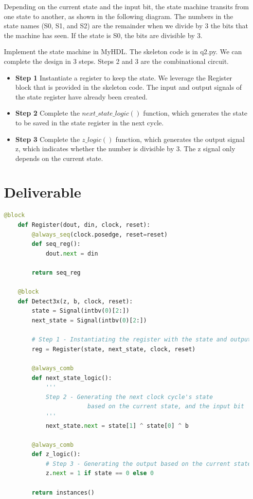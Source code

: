 \documentclass{article}
\begin{document}
\hfill \break
Depending on the current state and the input bit, the state machine transits from one state to another, as shown in the following diagram. The numbers in the state names (S0, S1, and S2) are the remainder when we divide by 3 the bits that the machine has seen. If the state is S0, the bits are divisible by 3.

\hfill \break
Implement the state machine in MyHDL. The skeleton code is in q2.py. We can complete the design in 3 steps. Steps 2 and 3 are the combinational circuit.

\begin{itemize}
    \item \textbf{Step 1} Instantiate a register to keep the state. We leverage the Register block that is provided in the skeleton code. The input and output signals of the state register have already been created.
    \item \textbf{Step 2} Complete the $next\_state\_logic()$ function, which generates the state to be saved in the state register in the next cycle.
    \item \textbf{Step 3} Complete the $z\_logic()$ function, which generates the output signal z, which indicates whether the number is divisible by 3. The z signal only depends on the current state.
\end{itemize}

\break
\section{Deliverable}
\begin{lstlisting}[language=Python,frame=tb]
    @block 
    def Register(dout, din, clock, reset):
        @always_seq(clock.posedge, reset=reset)
        def seq_reg():
            dout.next = din

        return seq_reg

    @block
    def Detect3x(z, b, clock, reset):
        state = Signal(intbv(0)[2:])
        next_state = Signal(intbv(0)[2:])
        
        # Step 1 - Instantiating the register with the state and output
        reg = Register(state, next_state, clock, reset)

        @always_comb
        def next_state_logic():
            '''
            Step 2 - Generating the next clock cycle's state
                        based on the current state, and the input bit
            '''
            next_state.next = state[1] ^ state[0] ^ b

        @always_comb
        def z_logic():
            # Step 3 - Generating the output based on the current state
            z.next = 1 if state == 0 else 0

        return instances()
\end{lstlisting}
\end{document}
